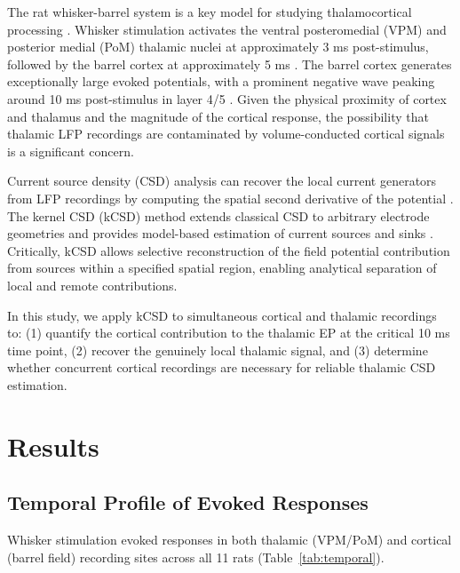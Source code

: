 \documentclass[11pt]{article}
\begin{document}
The rat whisker-barrel system is a key model for studying thalamocortical processing \citep{petersen2007, diamond2008}. Whisker stimulation activates the ventral posteromedial (VPM) and posterior medial (PoM) thalamic nuclei at approximately 3 ms post-stimulus, followed by the barrel cortex at approximately 5 ms \citep{simons1978, swadlow2003}. The barrel cortex generates exceptionally large evoked potentials, with a prominent negative wave peaking around 10 ms post-stimulus in layer 4/5 \citep{mitzdorf1985}. Given the physical proximity of cortex and thalamus and the magnitude of the cortical response, the possibility that thalamic LFP recordings are contaminated by volume-conducted cortical signals is a significant concern.

Current source density (CSD) analysis can recover the local current generators from LFP recordings by computing the spatial second derivative of the potential \citep{nicholson1975, mitzdorf1985}. The kernel CSD (kCSD) method extends classical CSD to arbitrary electrode geometries and provides model-based estimation of current sources and sinks \citep{potworowski2012, wojcik2015}. Critically, kCSD allows selective reconstruction of the field potential contribution from sources within a specified spatial region, enabling analytical separation of local and remote contributions.

In this study, we apply kCSD to simultaneous cortical and thalamic recordings to: (1) quantify the cortical contribution to the thalamic EP at the critical 10 ms time point, (2) recover the genuinely local thalamic signal, and (3) determine whether concurrent cortical recordings are necessary for reliable thalamic CSD estimation.

\section{Results}

\subsection{Temporal Profile of Evoked Responses}

Whisker stimulation evoked responses in both thalamic (VPM/PoM) and cortical (barrel field) recording sites across all 11 rats (Table~\ref{tab:temporal}).
\end{document}

